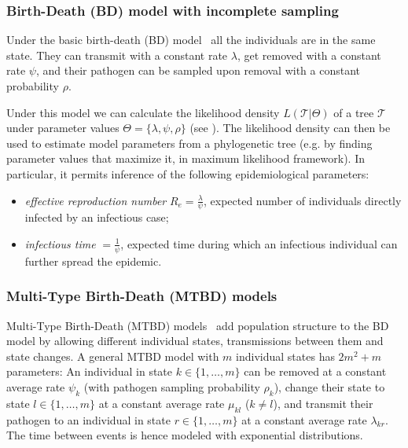 \documentclass[10pt,letterpaper]{article}
\begin{document}
\subsubsection*{Birth-Death (BD) model with incomplete sampling}
Under the basic birth-death (BD) model~\cite{Stadler2009} all the individuals are in the same state. They can transmit with a constant rate $\lambda$, get removed with a constant rate $\psi$, and their pathogen can be sampled upon removal with a constant probability $\rho$. 

Under this model we can calculate the likelihood density $L(\mathscr{T}|\Theta)$ of a tree $\mathscr{T}$ under parameter values $\Theta = \{\lambda, \psi, \rho\}$ (see ). The likelihood density can then be used to estimate model parameters from a phylogenetic tree (e.g. by finding parameter values that maximize it, in maximum likelihood framework). In particular, it permits inference of the following epidemiological parameters: 

\begin{itemize}
\item \textit{effective reproduction number} $R_e = \frac{\lambda}{\psi}$, expected number of individuals directly infected by an infectious case;
\item \textit{infectious time} $=\frac{1}{\psi}$, expected time during which an infectious individual can further spread the epidemic.
\end{itemize} 



\subsubsection*{Multi-Type Birth-Death (MTBD) models}
Multi-Type Birth-Death (MTBD) models~\cite{Stadler2013a} add population structure to the BD model by allowing different individual states, transmissions between them and state changes. A general MTBD model with $m$ individual states has $2m^2 + m$ parameters: An individual in state $k \in \{1, \ldots, m\}$ can be removed at a constant average rate $\psi_k$ (with pathogen sampling probability $\rho_k$), change their state to state $l \in \{1, \ldots, m\}$ at a constant average rate $\mu_{kl}$ ($k \neq l$), and transmit their pathogen to an individual in state $r \in \{1, \ldots, m\} $ at a constant average rate $\lambda_{kr}$. The time between events %
is hence modeled with exponential distributions.
\end{document}
